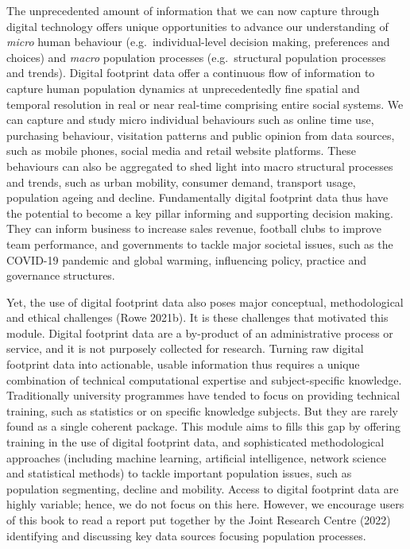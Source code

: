 \documentclass[
  letterpaper,
  DIV=11,
  numbers=noendperiod]{scrreprt}
\begin{document}
The unprecedented amount of information that we can now capture through
digital technology offers unique opportunities to advance our
understanding of \emph{micro} human behaviour (e.g.~individual-level
decision making, preferences and choices) and \emph{macro} population
processes (e.g.~structural population processes and trends). Digital
footprint data offer a continuous flow of information to capture human
population dynamics at unprecedentedly fine spatial and temporal
resolution in real or near real-time comprising entire social systems.
We can capture and study micro individual behaviours such as online time
use, purchasing behaviour, visitation patterns and public opinion from
data sources, such as mobile phones, social media and retail website
platforms. These behaviours can also be aggregated to shed light into
macro structural processes and trends, such as urban mobility, consumer
demand, transport usage, population ageing and decline. Fundamentally
digital footprint data thus have the potential to become a key pillar
informing and supporting decision making. They can inform business to
increase sales revenue, football clubs to improve team performance, and
governments to tackle major societal issues, such as the COVID-19
pandemic and global warming, influencing policy, practice and governance
structures.

Yet, the use of digital footprint data also poses major conceptual,
methodological and ethical challenges (Rowe 2021b). It is these
challenges that motivated this module. Digital footprint data are a
by-product of an administrative process or service, and it is not
purposely collected for research. Turning raw digital footprint data
into actionable, usable information thus requires a unique combination
of technical computational expertise and subject-specific knowledge.
Traditionally university programmes have tended to focus on providing
technical training, such as statistics or on specific knowledge
subjects. But they are rarely found as a single coherent package. This
module aims to fills this gap by offering training in the use of digital
footprint data, and sophisticated methodological approaches (including
machine learning, artificial intelligence, network science and
statistical methods) to tackle important population issues, such as
population segmenting, decline and mobility. Access to digital footprint
data are highly variable; hence, we do not focus on this here. However,
we encourage users of this book to read a report put together by the
Joint Research Centre (2022) identifying and discussing key data sources
focusing population processes.
\end{document}
